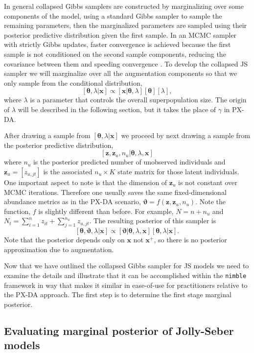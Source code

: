 \documentclass[12pt]{article}
\newcommand{\bx}{\ensuremath{\mathbf{x}}}
\newcommand{\bz}{\ensuremath{\mathbf{z}}}
\newcommand{\bt}{\ensuremath{\boldsymbol{\theta}}}
\newcommand{\bvt}{\ensuremath{\boldsymbol{\vartheta}}}
\begin{document}
In general collapsed Gibbs samplers are constructed by marginalizing over some components of the model, using a standard Gibbs sampler to sample the remaining parameters, then the marginalized parameters are sampled using their posterior predictive distribution given the first sample. In an MCMC sampler with strictly Gibbs updates, faster convergence is achieved because the first sample is not conditioned on the second sample components, reducing the covariance between them and speeding convergence \citep{Liu1994a}. To develop the collapsed JS sampler we will marginalize over all the augmentation components so that we only sample from the conditional distribution,
\[
[\bt,\lambda|\bx] \propto  [\bx|\bt,\lambda][\bt][\lambda],
\]
where $\lambda$ is a parameter that controls the overall superpopulation size. The origin of $\lambda$ will be described in the following section, but it takes the place of $\gamma$ in PX-DA.

After drawing a sample from $[\bt,\lambda|\bx]$ we proceed by next drawing a sample from the posterior predictive distribution,
\[
 [\bz, \bz_u, n_u|\bt,\lambda,\bx]
\]
where $n_u$ is the posterior predicted number of unobserved individuals and $\bz_u = [z_{u,jt}]$ is the associated $n_u \times K$ state matrix for those latent individuals. One important aspect to note is that the dimension of $\bz_u$ is not constant over MCMC iterations. Therefore one usually saves the same fixed-dimensional abundance metrics as in the PX-DA scenario, $\bvt = f(\bz,\bz_u,n_u)$. Note the function, $f$ is slightly different than before. For example, $N = n+n_u$ and $N_t = \sum_{i=1}^n z_{it} +  \sum_{j=1}^{n_u} z_{u,jt}$. The resulting posterior of this sampler is
\[
[\bt, \bvt, \lambda|\bx] \propto [\bvt|\bt,\lambda,\bx][\bt,\lambda|\bx].
\]
Note that the posterior depends only on $\bx$ not $\bx^+$, so there is no posterior approximation due to augmentation.

Now that we have outlined the collapsed Gibbs sampler for JS models we need to examine the details and illustrate that it can be accomplished within the \verb|nimble| framework in way that makes it similar in ease-of-use for practitioners relative to the PX-DA approach. The first step is to determine the first stage marginal posterior. 

\subsection{Evaluating marginal posterior of Jolly-Seber models}
\end{document}
